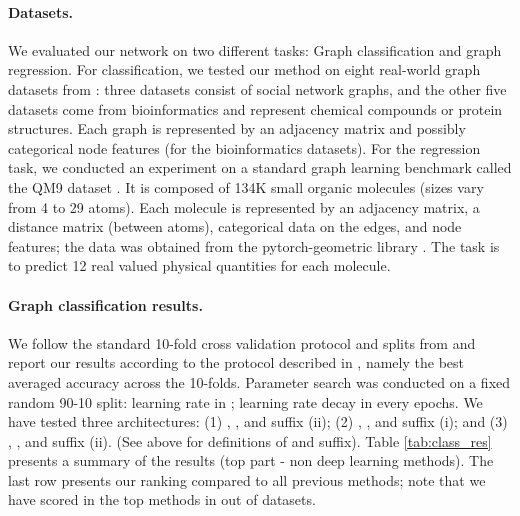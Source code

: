 \documentclass{article}
\begin{document}
\paragraph{Datasets.} We evaluated our network on two different tasks: Graph classification and graph regression. For classification, we tested our method on eight real-world graph datasets from \citep{Yanardag2015}: three datasets consist of social network graphs, and the other five datasets come from bioinformatics and represent chemical compounds or protein structures. Each graph is represented by an adjacency matrix and possibly categorical node features (for the bioinformatics datasets). For the regression task, we conducted an experiment on a standard graph learning benchmark called the QM9 dataset \citep{ramakrishnan2014quantum, wu2018moleculenet}. It is composed of 134K small organic molecules (sizes vary from 4 to 29 atoms). Each molecule is represented by an adjacency matrix, a distance matrix (between atoms), categorical data on the edges, and node features; the data was obtained from the pytorch-geometric library \citep{fey2019fast}. The task is to predict 12 real valued physical quantities for each molecule. 




\paragraph{Graph classification results.} 
We follow the standard 10-fold cross validation protocol and splits from \cite{Zhang} and report our results according to the protocol described in \cite{xu2018how}, namely the best averaged accuracy across the 10-folds. Parameter search was conducted on a fixed random 90-10 split: learning rate in ; learning rate decay in  every  epochs.
We have tested three architectures: (1) , , and suffix (ii); (2) , , and suffix (i); and (3) , , and suffix (ii). (See above for definitions of  and suffix). Table \ref{tab:class_res} presents a summary of the results (top part - non deep learning methods). The last row presents our ranking compared to all previous methods; note that we have scored in the top  methods in  out of  datasets.  




\pagebreak
\end{document}
